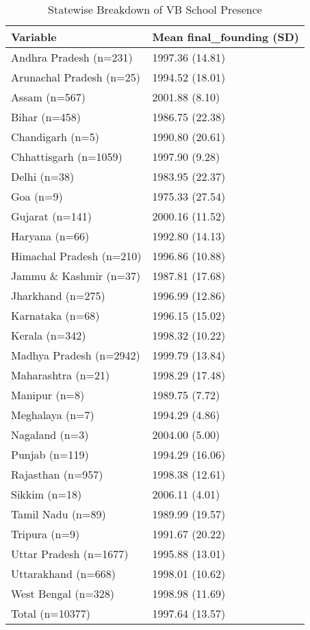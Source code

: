 \begin{table}

\caption{Statewise Breakdown of VB School Presence}
\centering
\begin{tabular}[t]{l|l}
\hline
Variable & Mean final\_founding (SD)\\
\hline
Andhra Pradesh (n=231) & 1997.36 (14.81)\\
\hline
Arunachal Pradesh (n=25) & 1994.52 (18.01)\\
\hline
Assam (n=567) & 2001.88 (8.10)\\
\hline
Bihar (n=458) & 1986.75 (22.38)\\
\hline
Chandigarh (n=5) & 1990.80 (20.61)\\
\hline
Chhattisgarh (n=1059) & 1997.90 (9.28)\\
\hline
Delhi (n=38) & 1983.95 (22.37)\\
\hline
Goa (n=9) & 1975.33 (27.54)\\
\hline
Gujarat (n=141) & 2000.16 (11.52)\\
\hline
Haryana (n=66) & 1992.80 (14.13)\\
\hline
Himachal Pradesh (n=210) & 1996.86 (10.88)\\
\hline
Jammu \& Kashmir (n=37) & 1987.81 (17.68)\\
\hline
Jharkhand (n=275) & 1996.99 (12.86)\\
\hline
Karnataka (n=68) & 1996.15 (15.02)\\
\hline
Kerala (n=342) & 1998.32 (10.22)\\
\hline
Madhya Pradesh (n=2942) & 1999.79 (13.84)\\
\hline
Maharashtra (n=21) & 1998.29 (17.48)\\
\hline
Manipur (n=8) & 1989.75 (7.72)\\
\hline
Meghalaya (n=7) & 1994.29 (4.86)\\
\hline
Nagaland (n=3) & 2004.00 (5.00)\\
\hline
Punjab (n=119) & 1994.29 (16.06)\\
\hline
Rajasthan (n=957) & 1998.38 (12.61)\\
\hline
Sikkim (n=18) & 2006.11 (4.01)\\
\hline
Tamil Nadu (n=89) & 1989.99 (19.57)\\
\hline
Tripura (n=9) & 1991.67 (20.22)\\
\hline
Uttar Pradesh (n=1677) & 1995.88 (13.01)\\
\hline
Uttarakhand (n=668) & 1998.01 (10.62)\\
\hline
West Bengal (n=328) & 1998.98 (11.69)\\
\hline
Total (n=10377) & 1997.64 (13.57)\\
\hline
\end{tabular}
\end{table}
